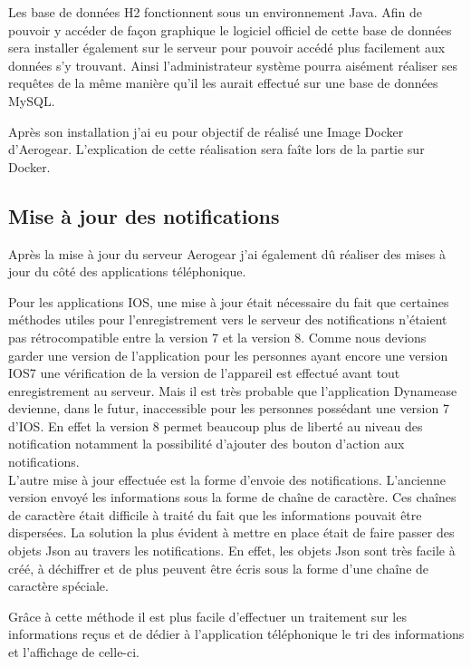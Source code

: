 Les base de données H2 fonctionnent sous un environnement Java. Afin de pouvoir y accéder de façon graphique le logiciel officiel de cette base de données sera installer également sur le serveur pour pouvoir accédé plus facilement aux données s'y trouvant. Ainsi l'administrateur système pourra aisément réaliser ses requêtes de la même manière qu'il les aurait effectué sur une base de données MySQL.

Après son installation j'ai eu pour objectif de réalisé une Image Docker d'Aerogear. L'explication de cette réalisation sera faîte lors de la partie sur Docker.

\subsection{Mise à jour des notifications}

Après la mise à jour du serveur Aerogear j'ai également dû réaliser des mises à jour du côté des applications téléphonique.

Pour les applications IOS, une mise à jour était nécessaire du fait que certaines méthodes utiles pour l'enregistrement vers le serveur des notifications n'étaient pas rétrocompatible entre la version 7 et la version 8. Comme nous devions garder une version de l'application pour les personnes ayant encore une version IOS7 une vérification de la version de l'appareil est effectué avant tout enregistrement au serveur. Mais il est très probable que l'application Dynamease devienne, dans le futur, inaccessible pour les personnes possédant une version 7 d'IOS. En effet la version 8 permet beaucoup plus de liberté au niveau des notification notamment la possibilité d'ajouter des bouton d'action aux notifications.\\

L'autre mise à jour effectuée est la forme d'envoie des notifications. L'ancienne version envoyé les informations sous la forme de chaîne de caractère. Ces chaînes de caractère était difficile à traité du fait que les informations pouvait être dispersées. La solution la plus évident à mettre en place était de faire passer des objets Json au travers les notifications. En effet, les objets Json sont très facile à créé, à déchiffrer et de plus peuvent être écris sous la forme d'une chaîne de caractère spéciale.

Grâce à cette méthode il est plus facile d'effectuer un traitement sur les informations reçus et de dédier à l'application téléphonique le tri des informations et l'affichage de celle-ci.

